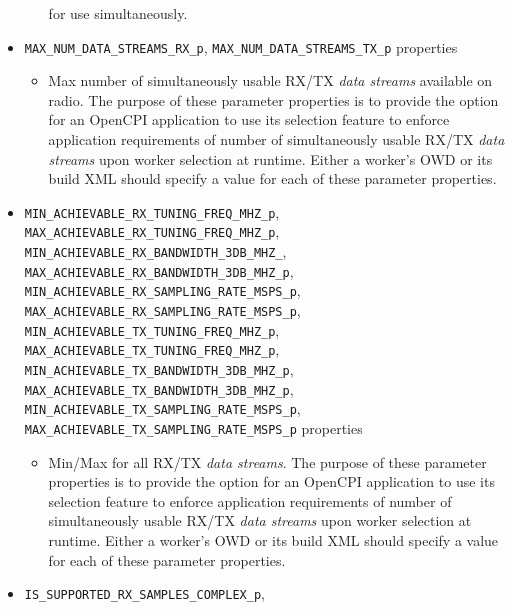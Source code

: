 \documentclass{article}
\begin{document}
\begin{itemize}
\begin{itemize}
          for use
          simultaneously.
      \end{itemize}
    \item \verb+MAX_NUM_DATA_STREAMS_RX_p+, \verb+MAX_NUM_DATA_STREAMS_TX_p+
      properties
      \begin{itemize}
        \item Max number of simultaneously usable RX/TX \textit{data streams}
          available
          on radio.
          The purpose of these parameter properties is to provide the option for
          an OpenCPI
          application to use its selection feature\cite{ocpi_app_guide} to
          enforce
          application requirements of number of simultaneously usable
          RX/TX \textit{data streams} upon worker
          selection at runtime.
          Either a worker's OWD or its build XML should
          specify a value for each of these parameter properties.
    \end{itemize}
    \item \verb+MIN_ACHIEVABLE_RX_TUNING_FREQ_MHZ_p+,
      \verb+MAX_ACHIEVABLE_RX_TUNING_FREQ_MHZ_p+, \\
      \verb+MIN_ACHIEVABLE_RX_BANDWIDTH_3DB_MHZ_+,
      \verb+MAX_ACHIEVABLE_RX_BANDWIDTH_3DB_MHZ_p+, \\
      \verb+MIN_ACHIEVABLE_RX_SAMPLING_RATE_MSPS_p+,
      \verb+MAX_ACHIEVABLE_RX_SAMPLING_RATE_MSPS_p+, \\
      \verb+MIN_ACHIEVABLE_TX_TUNING_FREQ_MHZ_p+,
      \verb+MAX_ACHIEVABLE_TX_TUNING_FREQ_MHZ_p+, \\
      \verb+MIN_ACHIEVABLE_TX_BANDWIDTH_3DB_MHZ_p+,
      \verb+MAX_ACHIEVABLE_TX_BANDWIDTH_3DB_MHZ_p+, \\
      \verb+MIN_ACHIEVABLE_TX_SAMPLING_RATE_MSPS_p+,
      \verb+MAX_ACHIEVABLE_TX_SAMPLING_RATE_MSPS_p+ properties
      \begin{itemize}
        \item  Min/Max for all RX/TX \textit{data streams}.
          The purpose of these parameter properties is to provide the option for
          an OpenCPI
          application to use its selection feature\cite{ocpi_app_guide} to
          enforce
          application requirements of number of simultaneously usable
          RX/TX \textit{data streams} upon worker
          selection at runtime.
          Either a worker's OWD or its build XML
          should specify a value for each of these parameter properties.
      \end{itemize}
    \item \verb+IS_SUPPORTED_RX_SAMPLES_COMPLEX_p+,

\end{itemize}
\end{document}
